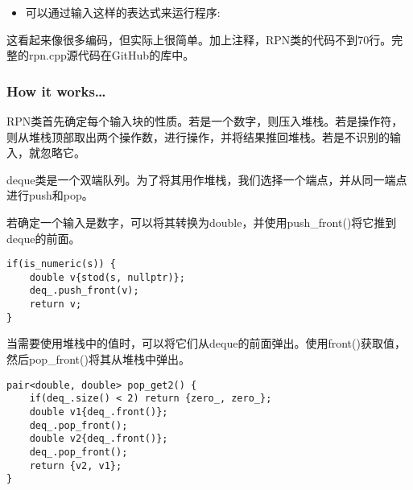 \begin{itemize}
\begin{lstlisting}[style=styleCXX]
int main() {
	RPN rpn;
	
	for(string o{}; cin >> o; ) {
		rpn.op(o);
		auto stack_str{rpn.get_stack_string()};
		cout << format("{}: {}\n", o, stack_str);
	}
}
\end{lstlisting}

我们将通过从命令行将字符串输送到程序中来进行测试，使用for循环从cin流中获取每个单词，并将其传递给rpn.op()。我喜欢这里的for循环，因为其很容易包含o变量的作用域。然后，在每个命令行项后使用get\_stack\_string()函数打印堆栈。

\item 
可以通过输入这样的表达式来运行程序:

\end{itemize}

这看起来像很多编码，但实际上很简单。加上注释，RPN类的代码不到70行。完整的rpn.cpp源代码在GitHub的库中。

\subsubsection{How it works…}

RPN类首先确定每个输入块的性质。若是一个数字，则压入堆栈。若是操作符，则从堆栈顶部取出两个操作数，进行操作，并将结果推回堆栈。若是不识别的输入，就忽略它。

deque类是一个双端队列。为了将其用作堆栈，我们选择一个端点，并从同一端点进行push和pop。

若确定一个输入是数字，可以将其转换为double，并使用push\_front()将它推到deque的前面。

\begin{lstlisting}[style=styleCXX]
if(is_numeric(s)) {
	double v{stod(s, nullptr)};
	deq_.push_front(v);
	return v;
}
\end{lstlisting}

当需要使用堆栈中的值时，可以将它们从deque的前面弹出。使用front()获取值，然后pop\_front()将其从堆栈中弹出。

\begin{lstlisting}[style=styleCXX]
pair<double, double> pop_get2() {
	if(deq_.size() < 2) return {zero_, zero_};
	double v1{deq_.front()};
	deq_.pop_front();
	double v2{deq_.front()};
	deq_.pop_front();
	return {v2, v1};
}
\end{lstlisting}


